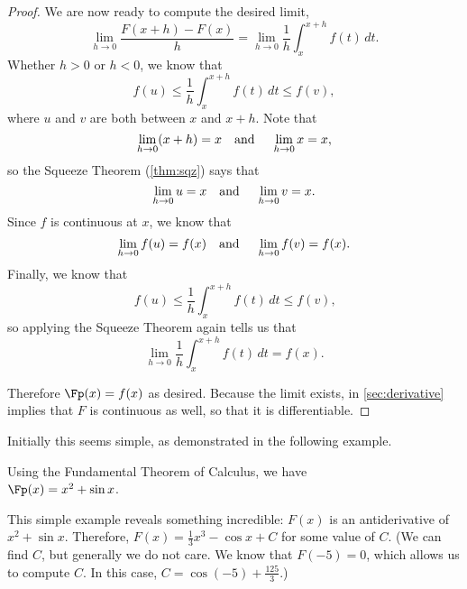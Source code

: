 \begin{proof}
We are now ready to compute the desired limit,
\[\lim_{h\to 0}\frac{F(x+h)-F(x)}{h}=\lim_{h\to 0}\frac1h\int_x^{x+h} f(t)\,dt.\]
Whether $h>0$ or $h<0$, we know that
\[f(u)\leq \frac1h\int_x^{x+h} f(t)\,dt\leq f(v),\]
where $u$ and $v$ are both between $x$ and $x+h$. Note that 
\[\lim_{h\to 0} (x+h)=x \text{\quad and \quad} \lim_{h\to 0} x=x,\]
so the Squeeze Theorem (\autoref{thm:sqz}) says that
\[\lim_{h\to 0}u=x \text{\quad and \quad} \lim_{h\to 0} v=x.\]
Since $f$ is continuous at $x$, we know that
\[\lim_{h\to 0} f(u)=f(x)\text{\quad and \quad} \lim_{h\to 0}f(v)=f(x).\]
Finally, we know that
\[f(u)\leq \frac1h \int_x^{x+h} f(t)\,dt\leq f(v)\text{,}\]
so applying the Squeeze Theorem again tells us that
\[\lim_{h\to 0}\frac1h\int_x^{x+h} f(t)\,dt=f(x).\] 

Therefore $\Fp(x)=f(x)$ as desired.  Because the limit exists,  in \autoref{sec:derivative} implies that $F$ is continuous as well, so that it is differentiable.
\end{proof}


Initially this seems simple, as demonstrated in the following example.

{Using the Fundamental Theorem of Calculus, we have\\
$\Fp(x) = x^2+\sin x$.}

This simple example reveals something incredible: $F(x)$ is an antiderivative of $x^2+\sin x$. Therefore, $F(x) = \frac13x^3-\cos x+C$ for some value of $C$. (We can find $C$, but generally we do not care. We know that $F(-5)=0$, which allows us to compute $C$. In this case, $C=\cos(-5)+\frac{125}3$.)

